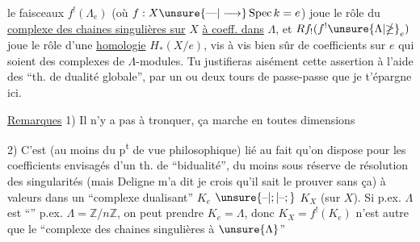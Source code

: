 %
le  faisceaux $f^!(\Lambda_e)$ (où $f:X\unsure{\text{---}|\longrightarrow}\operatorname{Spec} k=e$) joue le rôle du \uline{complexe des chaines singulières sur} $X$ \uline{à coeff. dans} $\Lambda$, et $Rf_!(f^!{\unsure{\Lambda|\mathbb{\Lambda}}}_e)$ joue le rôle d'une \uline{homologie} $H_*(X/e)$, vis à vis bien sûr de coefficients sur $e$ qui soient des complexes de $\Lambda$-modules. Tu justifieras aisément cette assertion à l'aide des ``th. de dualité globale'', par un ou deux tours de passe-passe que je t'épargne ici.

\uline{Remarques} 1) Il n'y a pas à tronquer, ça marche en toutes dimensions

2) C'est (au moins du p\textsuperscript{t} de vue philosophique) lié au fait qu'on dispose pour les coefficients envisagés  d'un th. de ``bidualité''\deleted{\unsure{)}}, du moins sous réserve de résolution des singularités (mais Deligne m'a dit je crois qu'il sait le prouver sans ça) à valeurs dans un ``complexe dualisant'' $K_e$  $\unsure{\text{--}|;|\text{--};}$ $K_X$ (sur $X$). Si p.ex. $\Lambda$ est ``''  p.ex. $\Lambda=\mathbb{Z}/n\mathbb{Z}$, on peut prendre $K_e=\Lambda$, donc  $K_X=f^!(K_e)$ n'est autre que le ``complexe des chaines singulières à   $\unsure{\Lambda}$'' 
